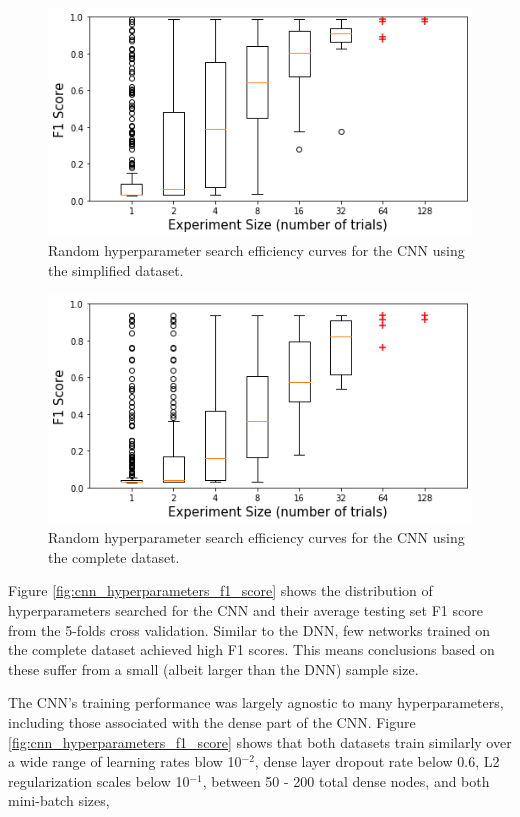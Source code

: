 \begin{figure}[H]
	\centering
	\includegraphics[width=0.8\linewidth]{images/random_hp_search_cnn_easy}
	\caption{Random hyperparameter search efficiency curves for the CNN using the simplified dataset.}
	\label{fig:random_hp_search_cnn_easy}
\end{figure}

\begin{figure}[H]
	\centering
	\includegraphics[width=0.8\linewidth]{images/random_hp_search_cnn_full}
	\caption{Random hyperparameter search efficiency curves for the CNN using the complete dataset.}
	\label{fig:random_hp_search_cnn_full}
\end{figure}


Figure \ref{fig:cnn_hyperparameters_f1_score} shows the distribution of hyperparameters searched for the CNN and their average testing set F1 score from the 5-folds cross validation. Similar to the DNN, few networks trained on the complete dataset achieved high F1 scores. This means conclusions based on these suffer from a small (albeit larger than the DNN) sample size.

The CNN's training performance was largely agnostic to many hyperparameters, including those associated with the dense part of the CNN. Figure \ref{fig:cnn_hyperparameters_f1_score} shows that both datasets train similarly over a wide range of learning rates blow 10$^{-2}$, dense layer dropout rate below 0.6, L2 regularization scales below 10$^{-1}$, between 50 - 200 total dense nodes, and both mini-batch sizes, 

